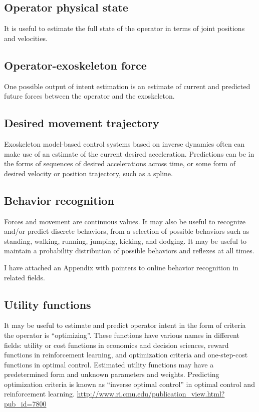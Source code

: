 \documentclass[letterpaper,12pt,fullpage]{article}
\begin{document}
\subsection{Operator physical state}

It is useful to estimate the full state of the operator in terms
of joint positions and velocities.

\subsection{Operator-exoskeleton force}

One possible output of intent estimation is an estimate of current
and predicted future forces between the operator and the exoskeleton.

\subsection{Desired movement trajectory}

Exoskeleton model-based control systems based on inverse dynamics often
can make use of an estimate of the current desired acceleration.
Predictions can be in the forms of sequences of desired accelerations
across time, or some form of desired velocity or position trajectory,
such as a spline.

\subsection{Behavior recognition}

Forces and movement are continuous values. It may also be useful to
recognize and/or predict discrete behaviors, from a selection of
possible behaviors such as 
standing, walking,
running, jumping, kicking, and dodging.
It may be useful to maintain a probability distribution of possible
behaviors and reflexes at all times.

I have attached an Appendix with pointers to online behavior
recognition in related fields.

\subsection{Utility functions}

It may be useful to estimate and predict operator intent in the form
of criteria the operator is ``optimizing''. These functions have
various names in different fields: utility or cost functions in economics
and decision sciences,
reward functions in reinforcement learning, and
optimization criteria and one-step-cost functions in optimal control.
Estimated utility functions may have a predetermined form and unknown
parameters and weights.
Predicting optimization criteria is known as ``inverse optimal control''
in optimal control and reinforcement learning.
\url{http://www.ri.cmu.edu/publication_view.html?pub_id=7800}
\end{document}
